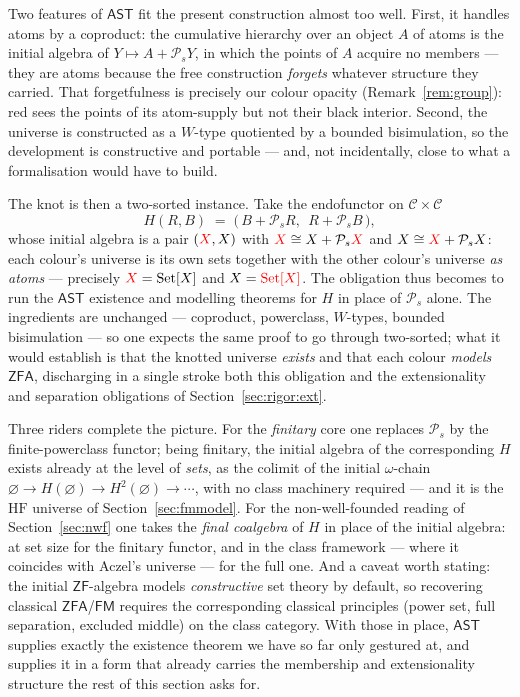 Two features of $\mathsf{AST}$ fit the present construction almost too well.
First, it handles atoms by a coproduct: the cumulative hierarchy over an object
$A$ of atoms is the initial algebra of $Y\mapsto A + \mathcal{P}_s Y$, in which the
points of $A$ acquire no members --- they are atoms because the free construction
\emph{forgets} whatever structure they carried. That forgetfulness is precisely
our colour opacity (Remark~\ref{rem:group}): red sees the points of its
atom-supply but not their black interior. Second, the universe is constructed as
a $W$-type quotiented by a bounded bisimulation, so the development is
constructive and portable --- and, not incidentally, close to what a
formalisation would have to build.

The knot is then a two-sorted instance. Take the endofunctor on
$\mathcal{C}\times\mathcal{C}$
\[
  H(R,B) \;=\; \bigl(\,B + \mathcal{P}_s R,\ \ R + \mathcal{P}_s B\,\bigr),
\]
whose initial algebra is a pair $(\textcolor{red}{X},\textcolor{black}{X})$ with $\textcolor{red}{X}\cong\textcolor{black}{X} + \mathcal{P}_s\textcolor{red}{X}$
and $\textcolor{black}{X}\cong\textcolor{red}{X} + \mathcal{P}_s\textcolor{black}{X}$: each colour's universe is its own sets
together with the other colour's universe \emph{as atoms} --- precisely
$\textcolor{red}{X}=\textcolor{black}{\mathrm{Set}[X]}$ and $\textcolor{black}{X}=\textcolor{red}{\mathrm{Set}[X]}$. The obligation thus becomes to run the
$\mathsf{AST}$ existence and modelling theorems for $H$ in place of
$\mathcal{P}_s$ alone. The ingredients are unchanged --- coproduct, powerclass,
$W$-types, bounded bisimulation --- so one expects the same proof to go through
two-sorted; what it would establish is that the knotted universe \emph{exists} and
that each colour \emph{models} $\mathsf{ZFA}$, discharging in a single stroke both
this obligation and the extensionality and separation obligations of
Section~\ref{sec:rigor:ext}.

Three riders complete the picture. For the \emph{finitary} core one replaces
$\mathcal{P}_s$ by the finite-powerclass functor; being finitary, the initial
algebra of the corresponding $H$ exists already at the level of \emph{sets}, as
the colimit of the initial $\omega$-chain $\varnothing\to H(\varnothing)\to
H^2(\varnothing)\to\cdots$, with no class machinery required --- and it is the
$\mathrm{HF}$ universe of Section~\ref{sec:fmmodel}. For the non-well-founded
reading of Section~\ref{sec:nwf} one takes the \emph{final coalgebra} of $H$ in
place of the initial algebra: at set size for the finitary functor, and in the
class framework --- where it coincides with Aczel's universe --- for the full one.
And a caveat worth stating: the initial $\mathsf{ZF}$-algebra models
\emph{constructive} set theory by default, so recovering classical
$\mathsf{ZFA}$/$\mathsf{FM}$ requires the corresponding classical principles
(power set, full separation, excluded middle) on the class category. With those in
place, $\mathsf{AST}$ supplies exactly the existence theorem we have so
far only gestured at, and supplies it in a form that already carries the
membership and extensionality structure the rest of this section asks for.

